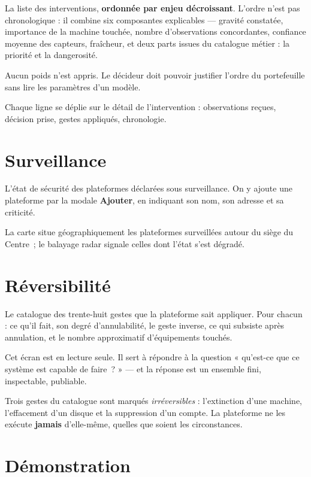 La liste des interventions, \textbf{ordonnée par enjeu décroissant}. L'ordre
n'est pas chronologique : il combine six composantes explicables — gravité
constatée, importance de la machine touchée, nombre d'observations
concordantes, confiance moyenne des capteurs, fraîcheur, et deux parts issues
du catalogue métier : la priorité et la dangerosité.

Aucun poids n'est appris. Le décideur doit pouvoir justifier l'ordre du
portefeuille sans lire les paramètres d'un modèle.

Chaque ligne se déplie sur le détail de l'intervention : observations reçues,
décision prise, gestes appliqués, chronologie.

\section{Surveillance}

L'état de sécurité des plateformes déclarées sous surveillance. On y ajoute une
plateforme par la modale \textbf{Ajouter}, en indiquant son nom, son adresse et
sa criticité.

La carte situe géographiquement les plateformes surveillées autour du siège du
Centre~; le balayage radar signale celles dont l'état s'est dégradé.

\section{Réversibilité}

Le catalogue des trente-huit gestes que la plateforme sait appliquer. Pour
chacun : ce qu'il fait, son degré d'annulabilité, le geste inverse, ce qui
subsiste après annulation, et le nombre approximatif d'équipements touchés.

Cet écran est en lecture seule. Il sert à répondre à la question « qu'est-ce
que ce système est capable de faire~? » — et la réponse est un ensemble fini,
inspectable, publiable.

\begin{tcolorbox}[colback=green!4!white, colframe=darkgreen,
  title=\textbf{Bon à savoir}, fonttitle=\bfseries, boxrule=0.6pt]
Trois gestes du catalogue sont marqués \emph{irréversibles} : l'extinction
d'une machine, l'effacement d'un disque et la suppression d'un compte. La
plateforme ne les exécute \textbf{jamais} d'elle-même, quelles que soient les
circonstances.
\end{tcolorbox}

\section{Démonstration}

